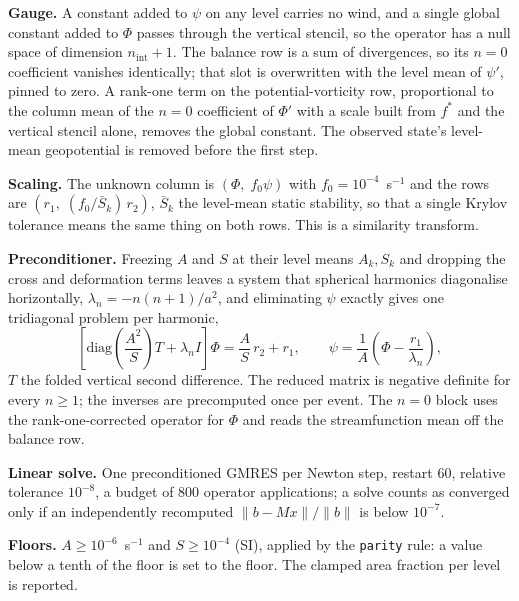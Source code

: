 \documentclass[11pt,a4paper]{article}
\newcommand{\code}[1]{\texttt{#1}}
\begin{document}
\textbf{Gauge.} A constant added to $\psi$ on any level carries no wind, and a
single global constant added to $\Phi$ passes through the vertical stencil, so
the operator has a null space of dimension $n_{\text{int}}+1$. The balance row
is a sum of divergences, so its $n=0$ coefficient vanishes identically; that
slot is overwritten with the level mean of $\psi'$, pinned to zero. A rank-one
term on the potential-vorticity row, proportional to the column mean of the
$n=0$ coefficient of $\Phi'$ with a scale built from $f^{*}$ and the vertical
stencil alone, removes the global constant. The observed state's level-mean
geopotential is removed before the first step.

\textbf{Scaling.} The unknown column is $(\Phi,\;f_0\psi)$ with
$f_0=10^{-4}$~s$^{-1}$ and the rows are $(r_1,\;(f_0/\bar S_k)\,r_2)$, $\bar S_k$
the level-mean static stability, so that a single Krylov tolerance means the
same thing on both rows. This is a similarity transform.

\textbf{Preconditioner.} Freezing $A$ and $S$ at their level means $A_k,S_k$
and dropping the cross and deformation terms leaves a system that spherical
harmonics diagonalise horizontally, $\lambda_n=-n(n+1)/a^2$, and eliminating
$\psi$ exactly gives one tridiagonal problem per harmonic,
\begin{equation}
\left[\mathrm{diag}\!\left(\frac{A^2}{S}\right)T + \lambda_n I\right]\Phi
 = \frac{A}{S}\,r_2 + r_1 ,
\qquad
\psi = \frac{1}{A}\left(\Phi - \frac{r_1}{\lambda_n}\right),
\label{eq:precond}
\end{equation}
$T$ the folded vertical second difference. The reduced matrix is negative
definite for every $n\ge1$; the inverses are precomputed once per event. The
$n=0$ block uses the rank-one-corrected operator for $\Phi$ and reads the
streamfunction mean off the balance row.

\textbf{Linear solve.} One preconditioned GMRES per Newton step, restart 60,
relative tolerance $10^{-8}$, a budget of 800 operator applications; a solve
counts as converged only if an independently recomputed $\|b-Mx\|/\|b\|$ is
below $10^{-7}$.

\textbf{Floors.} $A\ge10^{-6}$~s$^{-1}$ and $S\ge10^{-4}$ (SI), applied by
the \code{parity} rule: a value below a tenth of the floor is set to the
floor. The clamped area fraction per level is reported.
\end{document}
